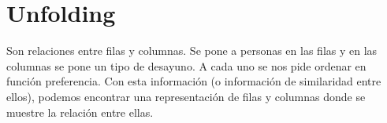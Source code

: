 \section{Unfolding}
Son relaciones entre filas y columnas. Se pone a personas en las filas y en las columnas se pone un tipo de desayuno. A cada uno se nos pide ordenar en función preferencia.
Con esta información (o información de similaridad entre ellos), podemos encontrar una representación de filas y columnas donde se muestre la relación entre ellas.



